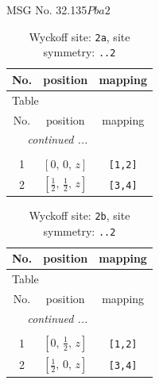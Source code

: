 \documentclass[fleqn,8pt]{jsarticle}
\begin{document}
\setcounter{MaxMatrixCols}{32}

\renewcommand{\tablename}{Table~}
\renewcommand{\figurename}{Figure~}
\begin{center}
\LARGE
MSG No. 32.135\quad$Pba2$
\end{center}
\renewcommand{\arraystretch}{1.2}
\begin{longtable}{ccc}
\caption{Wyckoff site: {\tt 2a}, site symmetry: {\tt ..2}}
 \\
 \hline \hline
No. & position & mapping \\ \hline \endfirsthead

\multicolumn{2}{l}{\tablename\ \thetable{}} \\
 \hline \hline
No. & position & mapping \\ \hline \endhead

 \hline \hline
\multicolumn{2}{r}{\footnotesize\it continued ...} \\ \endfoot

 \hline \hline
\multicolumn{2}{r}{} \\ \endlastfoot

1 & $\left[ 0,\, 0,\, z \right]$ & {\tt [1,2]} \\ \hline
2 & $\left[ \frac{1}{2},\, \frac{1}{2},\, z \right]$ & {\tt [3,4]} \\
\end{longtable}
\renewcommand{\arraystretch}{1.2}
\begin{longtable}{ccc}
\caption{Wyckoff site: {\tt 2b}, site symmetry: {\tt ..2}}
 \\
 \hline \hline
No. & position & mapping \\ \hline \endfirsthead

\multicolumn{2}{l}{\tablename\ \thetable{}} \\
 \hline \hline
No. & position & mapping \\ \hline \endhead

 \hline \hline
\multicolumn{2}{r}{\footnotesize\it continued ...} \\ \endfoot

 \hline \hline
\multicolumn{2}{r}{} \\ \endlastfoot

1 & $\left[ 0,\, \frac{1}{2},\, z \right]$ & {\tt [1,2]} \\ \hline
2 & $\left[ \frac{1}{2},\, 0,\, z \right]$ & {\tt [3,4]} \\
\end{longtable}
\renewcommand{\arraystretch}{1.2}
\end{document}
